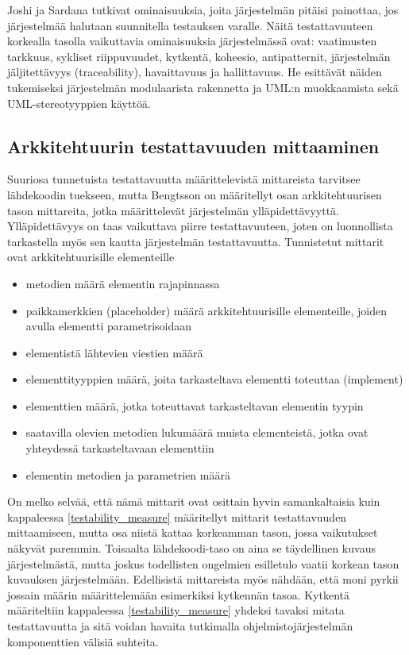 \documentclass[finnish]{tktltiki2}
\theoremstyle{definition}
\theoremstyle{remark}
\begin{document}
Joshi ja Sardana \citep{joshi_design_2014} tutkivat ominaisuuksia, joita järjestelmän pitäisi painottaa, jos järjestelmää halutaan suunnitella testauksen varalle. Näitä testattavuuteen korkealla tasolla vaikuttavia ominaisuuksia järjestelmässä ovat: vaatimusten tarkkuus, sykliset riippuvuudet, kytkentä, koheesio, antipatternit, järjestelmän jäljitettävyys (traceability), havaittavuus ja hallittavuus. He esittävät näiden tukemiseksi järjestelmän modulaarista rakennetta ja UML:n muokkaamista sekä UML-stereotyyppien käyttöä. 

\subsection{Arkkitehtuurin testattavuuden mittaaminen}

Suuriosa tunnetuista testattavuutta määrittelevistä mittareista tarvitsee lähdekoodin tuekseen, mutta Bengtsson \citep{bengtsson1998towards} on määritellyt osan arkkitehtuurisen tason mittareita, jotka määrittelevät järjestelmän ylläpidettävyyttä. Ylläpidettävyys on taas vaikuttava piirre testattavuuteen, joten on luonnollista tarkastella myös sen kautta järjestelmän testattavuutta. Tunnistetut mittarit ovat arkkitehtuurisille elementeille 

\begin{itemize}
	\item metodien määrä elementin rajapinnassa
	\item paikkamerkkien (placeholder) määrä arkkitehtuurisille elementeille, joiden avulla elementti parametrisoidaan
	\item elementistä lähtevien viestien määrä
	\item elementtityyppien määrä, joita tarkasteltava elementti toteuttaa (implement)
	\item elementtien määrä, jotka toteuttavat tarkasteltavan elementin tyypin
	\item saatavilla olevien metodien lukumäärä muista elementeistä, jotka ovat yhteydessä tarkasteltavaan elementtiin
	\item elementin metodien ja parametrien määrä
\end{itemize}

On melko selvää, että nämä mittarit ovat osittain hyvin samankaltaisia kuin kappaleessa \ref{testability_measure} määritellyt mittarit testattavuuden mittaamiseen, mutta osa niistä kattaa korkeamman tason, jossa vaikutukset näkyvät paremmin. Toisaalta lähdekoodi-taso on aina se täydellinen kuvaus järjestelmästä, mutta joskus todellisten ongelmien esilletulo vaatii korkean tason kuvauksen järjestelmään. Edellisistä mittareista myös nähdään, että moni pyrkii jossain määrin määrittelemään esimerkiksi kytkennän tasoa. Kytkentä määriteltiin kappaleessa \ref{testability_measure} yhdeksi tavaksi mitata testattavuutta ja sitä voidan havaita tutkimalla ohjelmistojärjestelmän komponenttien välisiä suhteita.
\end{document}
